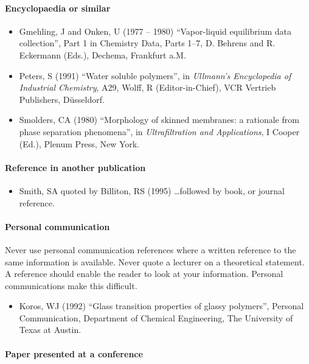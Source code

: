 \documentclass[a5paper, 10pt]{article}
\begin{document}
\paragraph{Encyclopaedia or similar}

\begin{itemize}
\item Gmehling, J and Onken, U (1977 -- 1980) ``Vapor-liquid
  equilibrium data collection'', Part 1 in Chemistry Data, Parts 1--7,
  D.  Behrens and R.  Eckermann (Eds.), Dechema, Frankfurt a.M.
\item Peters, S (1991) ``Water soluble polymers'', in
  \textit{Ullmann's Encyclopedia of Industrial Chemistry}, A29, Wolff,
  R (Editor-in-Chief), VCR Vertrieb Publishers, D\"usseldorf.
\item Smolders, CA (1980) ``Morphology of skinned membranes: a
  rationale from phase separation phenomena'', in
  \textit{Ultrafiltration and Applications}, I Cooper (Ed.), Plenum
  Press, New York.
\end{itemize}

\paragraph{Reference in another publication}

\begin{itemize}
\item Smith, SA quoted by Billiton, RS (1995) \dots followed by
  book, or journal reference.
\end{itemize}

\paragraph{Personal communication}
Never use personal communication references where a written reference
to the same information is available.  Never quote a lecturer on a
theoretical statement.  A reference should enable the reader to look
at your information.  Personal communications make this difficult.
\begin{itemize}
\item Koros, WJ (1992) ``Glass transition properties of glassy
  polymers'', Personal Communication, Department of Chemical
  Engineering, The University of Texas at Austin.
\end{itemize}

\paragraph{Paper presented at a conference}
\end{document}
